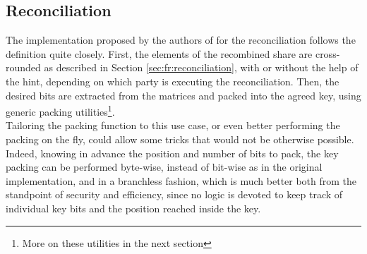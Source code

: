 \subsection{Reconciliation}\label{sec:imp:reconciliation}
The implementation proposed by the authors of \cite{frodo} for the reconciliation follows the definition quite closely. First, the elements of the recombined share are cross-rounded as described in Section \ref{sec:fr:reconciliation}, with or without the help of the hint, depending on which party is executing the reconciliation. Then, the desired bits are extracted from the matrices and packed into the agreed key, using generic packing utilities\footnote{More on these utilities in the next section}.\\
Tailoring the packing function to this use case, or even better performing the packing on the fly, could allow some tricks that would not be otherwise possible. Indeed, knowing in advance the position and number of bits to pack, the key packing can be performed byte-wise, instead of bit-wise as in the original implementation, and in a branchless fashion, which is much better both from the standpoint of security and efficiency, since no logic is devoted to keep track of individual key bits and the position reached inside the key.

